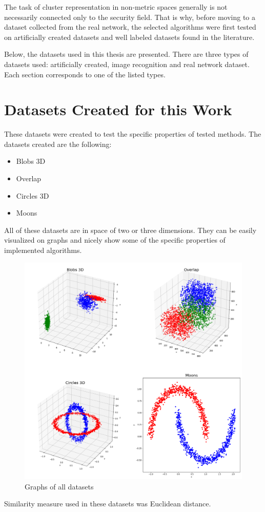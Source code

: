 \documentclass[thesis=B,english]{FITthesis}[2012/10/20]
\begin{document}
The task of cluster representation in non-metric spaces generally is not necessarily connected only to the security field.
That is why, before moving to a dataset collected from the real network, the selected algorithms were first tested on artificially created datasets and well labeled datasets found in the literature.

Below, the datasets used in this thesis are presented.
There are three types of datasets used: artificially created, image recognition and real network dataset.
Each section corresponds to one of the listed types.

\section{Datasets Created for this Work}

These datasets were created to test the specific properties of tested methods.
The datasets created are the following:
\begin{itemize}
    \item Blobs 3D
    \item Overlap
    \item Circles 3D
    \item Moons
\end{itemize}
All of these datasets are in space of two or three dimensions.
They can be easily visualized on graphs and nicely show some of the specific properties of implemented algorithms.
\begin{figure}
  \includegraphics[width=\linewidth]{img/datasets.png}
  \caption{Graphs of all datasets}
  \label{img:datasets}
\end{figure}
Similarity measure used in these datasets was Euclidean distance.
\end{document}
